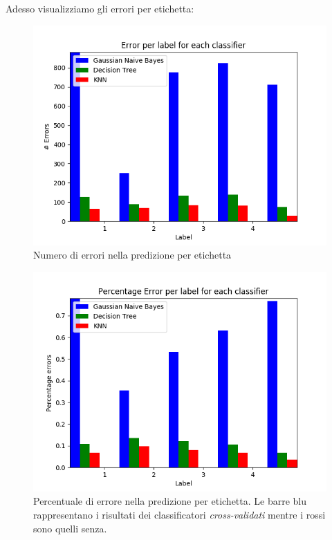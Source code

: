Adesso visualizziamo gli errori per etichetta:

\begin{figure}[H]
	\centering
	\includegraphics[width=0.7\linewidth]{img/test_error_per_label}
	\caption{Numero di errori nella predizione per etichetta}
	\label{fig:testerrorperlabel}
\end{figure}
\medskip
\begin{figure}[H]
	\centering
	\includegraphics[width=0.7\linewidth]{img/percentage_test_errors_per_label}
	\caption{Percentuale di errore nella predizione per etichetta. Le barre blu rappresentano i risultati dei classificatori \textit{cross-validati} mentre i rossi sono quelli senza.}
	\label{fig:percentagetesterrorsperlabel}
\end{figure}

